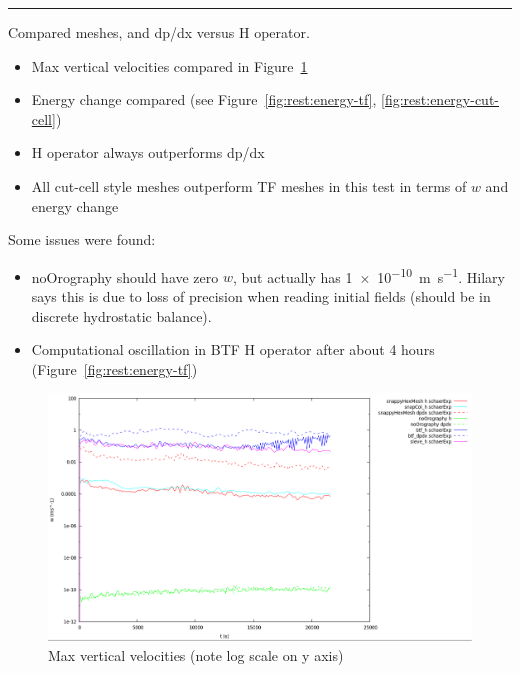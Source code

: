
\hrule

Compared meshes, and dp/dx versus H operator.

\begin{itemize}
\item Max vertical velocities compared in Figure~\ref{fig:rest:w}
\item Energy change compared (see Figure~\ref{fig:rest:energy-tf}, \ref{fig:rest:energy-cut-cell})
\item H operator always outperforms dp/dx
\item All cut-cell style meshes outperform TF meshes in this test in terms of $w$ and energy change
\end{itemize}
Some issues were found:
\begin{itemize}
\item noOrography should have zero $w$, but actually has \SI{1e-10}{\meter\per\second}.  Hilary says this is due to loss of precision when reading initial fields (should be in discrete hydrostatic balance).
\item Computational oscillation in BTF H operator after about 4 hours (Figure~\ref{fig:rest:energy-tf})
\end{itemize}

\begin{figure}
\includegraphics[width=\textwidth]{interim-results/verticalVelocityPlotSnappyHexMesh.png}
\caption{Max vertical velocities (note log scale on y axis)}
\label{fig:rest:w}
\end{figure}


